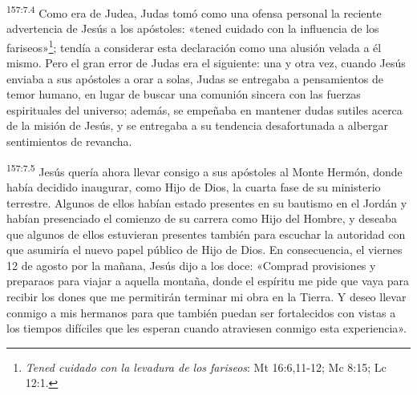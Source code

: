 \par 
\textsuperscript{157:7.4} Como era de Judea, Judas tomó como una ofensa personal la reciente advertencia de Jesús a los apóstoles: «tened cuidado con la influencia de los fariseos»\footnote{\textit{Tened cuidado con la levadura de los fariseos}: Mt 16:6,11-12; Mc 8:15; Lc 12:1.}; tendía a considerar esta declaración como una alusión velada a él mismo. Pero el gran error de Judas era el siguiente: una y otra vez, cuando Jesús enviaba a sus apóstoles a orar a solas, Judas se entregaba a pensamientos de temor humano, en lugar de buscar una comunión sincera con las fuerzas espirituales del universo; además, se empeñaba en mantener dudas sutiles acerca de la misión de Jesús, y se entregaba a su tendencia desafortunada a albergar sentimientos de revancha.

\par 
\textsuperscript{157:7.5} Jesús quería ahora llevar consigo a sus apóstoles al Monte Hermón, donde había decidido inaugurar, como Hijo de Dios, la cuarta fase de su ministerio terrestre. Algunos de ellos habían estado presentes en su bautismo en el Jordán y habían presenciado el comienzo de su carrera como Hijo del Hombre, y deseaba que algunos de ellos estuvieran presentes también para escuchar la autoridad con que asumiría el nuevo papel público de Hijo de Dios. En consecuencia, el viernes 12 de agosto por la mañana, Jesús dijo a los doce: «Comprad provisiones y preparaos para viajar a aquella montaña, donde el espíritu me pide que vaya para recibir los dones que me permitirán terminar mi obra en la Tierra. Y deseo llevar conmigo a mis hermanos para que también puedan ser fortalecidos con vistas a los tiempos difíciles que les esperan cuando atraviesen conmigo esta experiencia».